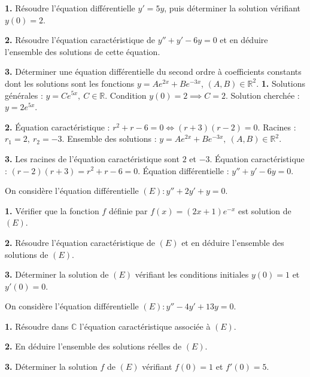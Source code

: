 \documentclass[11pt]{article}
\newcounter{popsec}
\newcounter{popsub}
\newcommand{\courssub}[1]{%
  \stepcounter{popsub}%
  \par\vspace{9pt}\noindent{\popxbold\fontsize{11.5}{13}\selectfont\color{popink}{\color{poporange}\thepopsec.\thepopsub}\hspace{6pt}#1}\par\nopagebreak\vspace{4pt}
}
\begin{document}
\begin{exoresolu}
\textbf{1.} Résoudre l'équation différentielle $y' = 5y$, puis déterminer la solution vérifiant $y(0) = 2$.

\textbf{2.} Résoudre l'équation caractéristique de $y'' + y' - 6y = 0$ et en déduire l'ensemble des solutions de cette équation.

\textbf{3.} Déterminer une équation différentielle du second ordre à coefficients constants dont les solutions sont les fonctions $y = Ae^{2x} + Be^{-3x}$, $(A, B) \in \mathbb{R}^2$.
\tcblower
\textbf{1.} Solutions générales : $y = Ce^{5x},\ C \in \mathbb{R}$.
Condition $y(0)=2 \implies C = 2$. Solution cherchée : $\boxed{y = 2e^{5x}}$.

\textbf{2.} Équation caractéristique : $r^2 + r - 6 = 0 \iff (r+3)(r-2)=0$. Racines : $r_1 = 2,\ r_2 = -3$.
Ensemble des solutions : $\boxed{y = Ae^{2x} + Be^{-3x},\ (A,B) \in \mathbb{R}^2}$.

\textbf{3.} Les racines de l'équation caractéristique sont $2$ et $-3$.
Équation caractéristique : $(r-2)(r+3) = r^2 + r - 6 = 0$.
Équation différentielle : $\boxed{y'' + y' - 6y = 0}$.
\end{exoresolu}

\courssub{Je m'entraîne}

\begin{exercice}
On considère l'équation différentielle $(E) : y'' + 2y' + y = 0$.

\textbf{1.} Vérifier que la fonction $f$ définie par $f(x) = (2x + 1)e^{-x}$ est solution de $(E)$.

\textbf{2.} Résoudre l'équation caractéristique de $(E)$ et en déduire l'ensemble des solutions de $(E)$.

\textbf{3.} Déterminer la solution de $(E)$ vérifiant les conditions initiales $y(0) = 1$ et $y'(0) = 0$.
\end{exercice}

\begin{exercice}
On considère l'équation différentielle $(E) : y'' - 4y' + 13y = 0$.

\textbf{1.} Résoudre dans $\mathbb{C}$ l'équation caractéristique associée à $(E)$.

\textbf{2.} En déduire l'ensemble des solutions réelles de $(E)$.

\textbf{3.} Déterminer la solution $f$ de $(E)$ vérifiant $f(0) = 1$ et $f'(0) = 5$.
\end{exercice}
\end{document}

